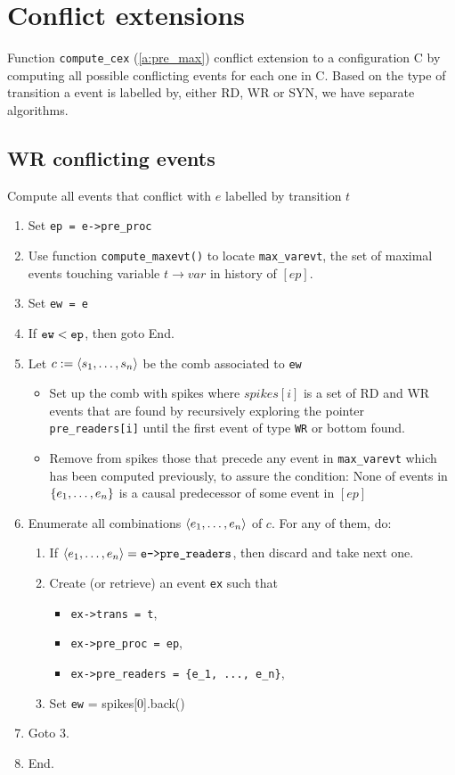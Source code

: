 \documentclass{llncs}
\begin{document}
\section{Conflict extensions}
Function \verb!compute_cex! (\cref{a:pre_max}) conflict extension to a configuration C by computing all possible conflicting events for each one in C.
Based on the type of transition a event is labelled by, either RD, WR or SYN, we have separate algorithms. 
\subsection{WR conflicting events}
Compute all events that conflict with $e$ labelled by transition $t$
\begin{enumerate}
\item Set \verb!ep = e->pre_proc!
\item
	Use function \verb!compute_maxevt()! to locate \verb!max_varevt!, the set of maximal events touching variable $t \rightarrow var$ in history of $[ep]$. 
\item Set \verb!ew = e!
\item If $\verb!ew! < \verb!ep!$, then goto End.
\item Let $c \mathrel{:=} \langle s_1, \ldots, s_n\rangle$ be the comb associated to \verb!ew!
	\begin{itemize}
	\item
		Set up the comb with spikes where $spikes[i]$ is a set of RD and WR events that are found by recursively exploring the
		pointer \verb!pre_readers[i]! until the first event of type \verb!WR! or bottom found.
	\item
		Remove from spikes those that precede any event in \verb!max_varevt! which has been computed previously, to assure the condition: None of events in ${\{ e_1, \ldots, e_n \mathclose \}} $ is a causal predecessor of some event in $[ep]$
\end{itemize}
\item
  Enumerate all combinations $\langle e_1, \ldots, e_n\rangle$ of $c$.
  For any of them, do:
  \begin{enumerate}
  \item
    If $\tup{e_1, \ldots, e_n} = \verb!e->pre_readers!$, then discard and take
    next one.
  \item
    Create (or retrieve) an event \verb!ex! such that
    \begin{itemize}
    \item \verb!ex->trans = t!,
    \item \verb!ex->pre_proc = ep!,
    \item \verb!ex->pre_readers = {e_1, ..., e_n}!,
    \end{itemize}
  \item
    Set \verb!ew! = spikes[0].back() 
  \end{enumerate}
\item Goto 3.
\item End.
\end{enumerate}
\end{document}
